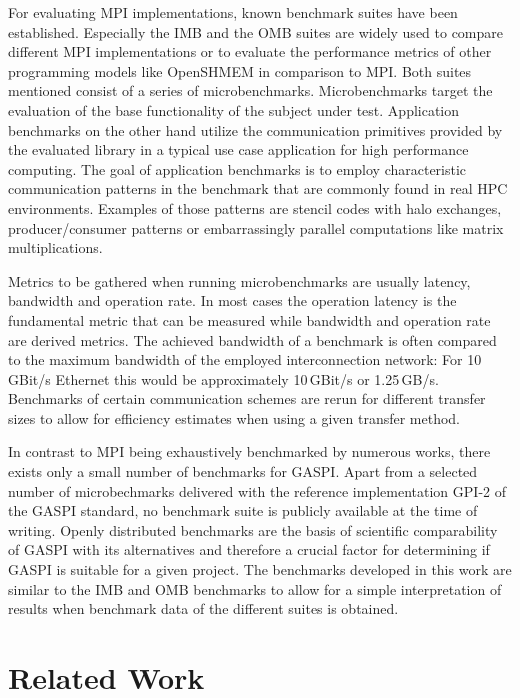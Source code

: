 For evaluating \ac{MPI} implementations, known benchmark suites have been established. Especially the \ac{IMB} and the \ac{OMB} suites are widely used to compare different \ac{MPI} implementations or to evaluate the performance metrics of other programming models like \ac{OpenSHMEM} in comparison to \ac{MPI}. Both suites mentioned consist of a series of microbenchmarks. Microbenchmarks target the evaluation of the base functionality of the subject under test. Application benchmarks on the other hand utilize the communication primitives provided by the evaluated library in a typical use case application for high performance computing. The goal of application benchmarks is to employ characteristic communication patterns in the benchmark that are commonly found in real \ac{HPC} environments. Examples of those patterns are stencil codes with halo exchanges, producer/consumer patterns or embarrassingly parallel computations like matrix multiplications. 

Metrics to be gathered when running microbenchmarks are usually latency, bandwidth and operation rate. In most cases the operation latency is the fundamental metric that can be measured while bandwidth and operation rate are derived metrics. The achieved bandwidth of a benchmark is often compared to the maximum bandwidth of the employed interconnection network: For 10\,GBit/s Ethernet this would be approximately 10\,GBit/s or 1.25\,GB/s. Benchmarks of certain communication schemes are rerun for different transfer sizes to allow for efficiency estimates when using a given transfer method.

In contrast to \ac{MPI} being exhaustively benchmarked by numerous works, there exists only a small number of benchmarks for \ac{GASPI}. Apart from a selected number of microbechmarks delivered with the reference implementation \acs{GPI}-2 of the \ac{GASPI} standard, no benchmark suite is publicly available at the time of writing. Openly distributed benchmarks are the basis of scientific comparability of \ac{GASPI} with its alternatives and therefore a crucial factor for determining if \ac{GASPI} is suitable for a given project. The benchmarks developed in this work are similar to the \ac{IMB} and \ac{OMB} benchmarks to allow for a simple interpretation of results when benchmark data of the different suites is obtained.

\section{Related Work}

